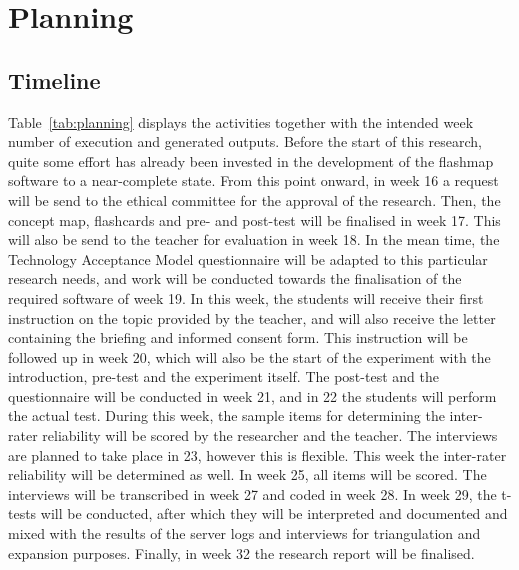 \chapter{Planning}

\section{Timeline}


Table~\ref{tab:planning} displays the activities together with the intended week number of execution and generated outputs. Before the start of this research, quite some effort has already been invested in the development of the flashmap software to a near-complete state. From this point onward, in week 16 a request will be send to the ethical committee for the approval of the research. Then, the concept map, flashcards and pre- and post-test will be finalised in week 17. This will also be send to the teacher for evaluation in week 18. In the mean time, the Technology Acceptance Model questionnaire will be adapted to this particular research needs, and work will be conducted towards the finalisation of the required software of week 19. In this week, the students will receive their first instruction on the topic provided by the teacher, and will also receive the letter containing the briefing and informed consent form. This instruction will be followed up in week 20, which will also be the start of the experiment with the introduction, pre-test and the experiment itself. The post-test and the questionnaire will be conducted in week 21, and in 22 the students will perform the actual test. During this week, the sample items for determining the inter-rater reliability will be scored by the researcher and the teacher. The interviews are planned to take place in 23, however this is flexible. This week the inter-rater reliability will be determined as well. In week 25, all items will be scored. The interviews will be transcribed in week 27 and coded in week 28. In week 29, the t-tests will be conducted, after which they will be interpreted and documented and mixed with the results of the server logs and interviews for triangulation and expansion purposes. Finally, in week 32 the research report will be finalised.

\setcounter{table}{0}

